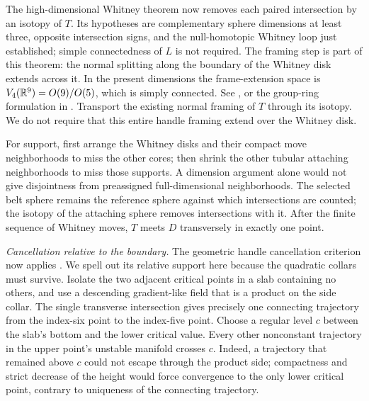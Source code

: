 The high-dimensional Whitney theorem now removes each paired
intersection by an isotopy of $T$.  Its hypotheses are complementary
sphere dimensions at least three, opposite intersection signs, and
the null-homotopic Whitney loop just established; simple connectedness
of $L$ is not required.  The framing step is part of this theorem:
the normal splitting along the boundary of the Whitney disk extends
across it.  In the present dimensions the frame-extension space is
$V_4(\mathbb R^9)=O(9)/O(5)$, which is simply connected.
See \cite[Theorem~6.6 and Lemma~6.13]{Milnor1965}, or the group-ring
formulation in \cite[Theorem~7.27(i) and Corollary~7.30]{Ranicki2002}.
Transport the existing normal framing of $T$ through its isotopy.
We do not require that this entire handle framing extend over the
Whitney disk.

For support, first arrange the Whitney disks and their compact move
neighborhoods to miss the other cores; then shrink the other tubular
attaching neighborhoods to miss those supports.  A dimension argument
alone would not give disjointness from preassigned full-dimensional
neighborhoods.  The selected belt sphere remains the reference sphere
against which intersections are counted; the isotopy of the attaching
sphere removes intersections with it.  After the finite sequence of
Whitney moves, $T$ meets $D$ transversely in exactly one point.

\smallskip
\noindent\emph{Cancellation relative to the boundary.}
The geometric handle cancellation criterion now applies
\cite[Lemma~8.24]{Ranicki2002}.  We spell out its relative support
here because the quadratic collars must survive.  Isolate the two
adjacent critical points in a slab containing no others, and use a
descending gradient-like field that is a product on the side collar.
The single transverse intersection gives precisely one connecting
trajectory from the index-six point to the index-five point.  Choose
a regular level $c$ between the slab's bottom and the lower critical
value.  Every other nonconstant trajectory in the upper point's unstable manifold
crosses $c$.  Indeed, a trajectory that remained above $c$ could not
escape through the product side; compactness and strict decrease of
the height would force convergence to the only lower critical point,
contrary to uniqueness of the connecting trajectory.

